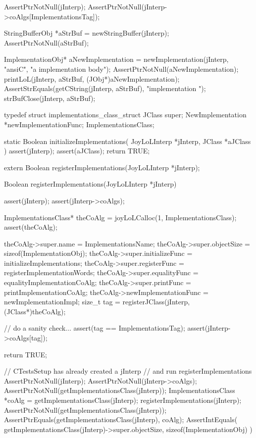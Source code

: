 \startCTest
  AssertPtrNotNull(jInterp);
  AssertPtrNotNull(jInterp->coAlgs[ImplementationsTag]);

  StringBufferObj *aStrBuf = newStringBuffer(jInterp);
  AssertPtrNotNull(aStrBuf);
  
  ImplementationObj* aNewImplementation =
    newImplementation(jInterp, "ansiC", "a implementation body");
  AssertPtrNotNull(aNewImplementation);
  printLoL(jInterp, aStrBuf, (JObj*)aNewImplementation);
  AssertStrEquals(getCString(jInterp, aStrBuf), "implementation ");
  strBufClose(jInterp, aStrBuf);
\stopCTest
\stopTestCase
\stopTestSuite

\startTestSuite[registerImplementations]

\startCHeader
typedef struct implementations_class_struct {
  JClass       super;
  NewImplementation      *newImplementationFunc;
} ImplementationsClass;

\stopCHeader

\startCCode
static Boolean initializeImplementations(
  JoyLoLInterp *jInterp,
  JClass   *aJClass
) {
  assert(jInterp);
  assert(aJClass);
  return TRUE;
}
\stopCCode

\startCHeader
extern Boolean registerImplementations(JoyLoLInterp *jInterp);
\stopCHeader
{}

\startCCode
Boolean registerImplementations(JoyLoLInterp *jInterp) {
  assert(jInterp);
  assert(jInterp->coAlgs);
  
  ImplementationsClass* theCoAlg
    = joyLoLCalloc(1, ImplementationsClass);
  assert(theCoAlg);
  
  theCoAlg->super.name           = ImplementationsName;
  theCoAlg->super.objectSize     = sizeof(ImplementationObj);
  theCoAlg->super.initializeFunc = initializeImplementations;
  theCoAlg->super.registerFunc   = registerImplementationWords;
  theCoAlg->super.equalityFunc   = equalityImplementationCoAlg;
  theCoAlg->super.printFunc      = printImplementationCoAlg;
  theCoAlg->newImplementationFunc = newImplementationImpl;
  size_t tag =
    registerJClass(jInterp, (JClass*)theCoAlg);
  
  // do a sanity check...
  assert(tag == ImplementationsTag);
  assert(jInterp->coAlgs[tag]);
   
  return TRUE;
}
\stopCCode


\startCTest
  // CTestsSetup has already created a jInterp
  // and run registerImplementations
  AssertPtrNotNull(jInterp);
  AssertPtrNotNull(jInterp->coAlgs);
  AssertPtrNotNull(getImplementationsClass(jInterp));
  ImplementationsClass *coAlg = getImplementationsClass(jInterp);
  registerImplementations(jInterp);
  AssertPtrNotNull(getImplementationsClass(jInterp));
  AssertPtrEquals(getImplementationsClass(jInterp), coAlg);
  AssertIntEquals(
    getImplementationsClass(jInterp)->super.objectSize,
    sizeof(ImplementationObj)
  )
\stopCTest
\stopTestCase
\stopTestSuite
